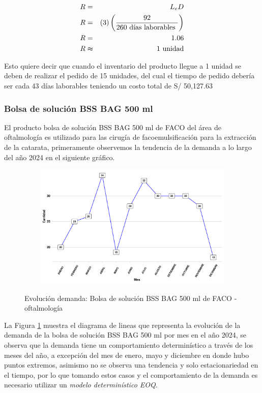 \begin{eqnarray}
    R &=& L_e D \nonumber \\
  R &=& (3) \left(\frac{92}{260\text{ días laborables }} \right) \nonumber \\
  R &=& 1.06 \nonumber \\
  R &\thickapprox& 1\text{ unidad}
\end{eqnarray}

Esto quiere decir que cuando el inventario del producto llegue a 1 unidad se deben de realizar el pedido de 15 unidades, del cual el tiempo de pedido debería ser cada 43 días laborables teniendo un costo total de S/ 50,127.63
\subsubsection{Bolsa de solución BSS BAG 500 ml}

El producto bolsa de solución BSS BAG 500 ml de FACO del área de oftalmología es utilizado para las cirugía de facoemulsificación para la extracción de la catarata, primeramente observemos la tendencia de la demanda a lo largo del año 2024 en el siguiente gráfico.

\begin{figure}[H]
  \caption{Evolución demanda: Bolsa de solución BSS BAG 500 ml de FACO - oftalmología}
  {\includegraphics[width=15cm, height=5.95cm]{images/PROD003_demanda.pdf}}
  \label{fig:PROD003_demanda}
\end{figure}

La Figura \ref{fig:PROD003_demanda} muestra el diagrama de lineas que representa la evolución de la demanda de la bolsa de solución BSS BAG 500 ml por mes en el año 2024, se observa que la demanda tiene un comportamiento determinístico a través de los meses del año, a excepción del mes de enero, mayo y diciembre en donde hubo puntos extremos, asimismo no se observa una tendencia y solo estacionariedad en el tiempo, por lo que tomando estos casos y el comportamiento de la demanda es necesario utilizar un \textsl{modelo determinístico EOQ}.

